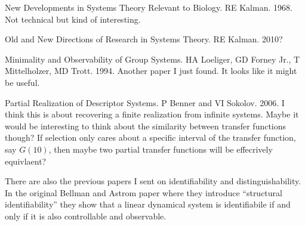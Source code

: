 \documentclass[a4paper, 11 pt]{article}
\begin{document}
New Developments in Systems Theory Relevant to Biology. RE Kalman. 1968.
Not technical but kind of interesting. 

Old and New Directions of Research in Systems Theory. RE Kalman. 2010?

Minimality and Observability of Group Systems. HA Loeliger, GD Forney Jr., T Mittelholzer, MD Trott. 1994. 
Another paper I just found. It looks like it might be useful.

Partial Realization of Descriptor Systems. P Benner and VI Sokolov. 2006. 
I think this is about recovering a finite realization from infinite systems. Maybe it would be interesting to think about the similarity between transfer functions though? If selection only cares about a specific interval of the transfer function, say $G(10)$, then maybe two partial transfer functions will be effecrively equivlaent? 

There are also the previous papers I sent on identifiability and distinguishability. In the original Bellman and Astrom paper where they introduce ``structural identifiability'' they show that a linear dynamical system is identifiabile if and only if it is also controllable and observable. 
\end{document}
